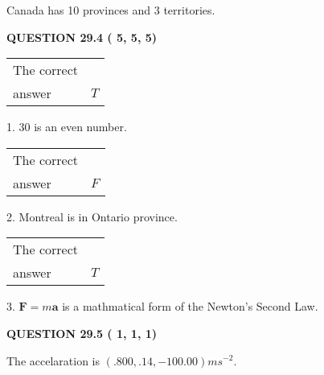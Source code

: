 \documentclass[12pt]{article}
\begin{document}
  
 
 
\noindent{}
 
 
Canada has  %
10 provinces and  %
3 territories.
 
 
 
 
  
\vspace{0.2in}
  
{\textbf{\Large{QUESTION
29.4 
 (          5,          5,          5)
}}}
  
  
 
 
\noindent{}

 
\noindent\begin{tabular}{|l|l|}\hline The correct & \\
          answer &  %
$T$ \\ \hline \end{tabular}
1. $ %
30$ is an  %
even number.
 
\noindent\begin{tabular}{|l|l|}\hline The correct & \\
          answer &  %
$F$ \\ \hline \end{tabular}
2.  %
Montreal is in  %
Ontario province.
 
\noindent\begin{tabular}{|l|l|}\hline The correct & \\
          answer &  %
$T$ \\ \hline \end{tabular}
3.  %
$\mathbf{F}=m\mathbf{a}$ is a mathmatical form of  %
the Newton's Second Law.
 
 
 
  
\vspace{0.2in}
  
{\textbf{\Large{QUESTION
29.5 
 (          1,          1,          1)
}}}
  
  


 
 
\noindent{}
 
 
The accelaration is $  %
(
.800,
.14,
-100.00)
ms^{-2} $.
 
 
 
 
 
 
\noindent{}
\end{document}
